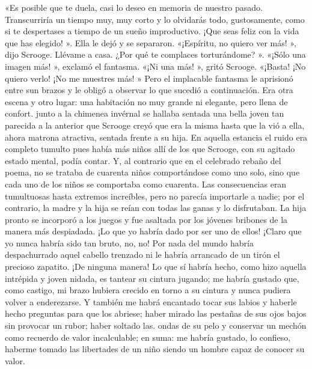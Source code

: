 \documentclass{novela}
\begin{document}
 «Es posible que te duela, casi lo deseo en memoria de nuestro pasado. Transcurriría un tiempo muy, muy corto y lo olvidarás todo, gustosamente, como si te despertases a tiempo de un sueño improductivo. ¡Que seas feliz con la vida que has elegido! ».
 Ella le dejó y se separaron.
 «¡Espíritu, no quiero ver más! », dijo Scrooge. Llévame a casa. ¿Por qué te complaces torturándome? ».
 «¡Sólo una imagen más! », exclamó el fantasma.
 «¡Ni una más! », gritó Scrooge. «¡Basta! ¡No quiero verlo! ¡No me muestres más! »
 Pero el implacable fantasma le aprisionó entre sun brazos y le obligó a observar lo que sucedió a continuación.
 Era otra escena y otro lugar: una habitación no muy grande ni elegante, pero llena de confort. junto a la chimenea invérnal se hallaba sentada una bella joven tan parecida a la anterior que Scrooge creyó que era la misma hasta que la vió a ella, ahora matrona atractiva, sentada frente a su hija. En aquella estancia el ruido era completo tumulto pues había más niños allí de los que Scrooge, con su agitado estado mental, podía contar. Y, al contrario que en el celebrado rebaño del poema, no se trataba de cuarenta niños comportándose como uno solo, sino que cada uno de los niños se comportaba como cuarenta. Las consecuencias eran tumultuosas hasta extremos increíbles, pero no parecía importarle a nadie; por el contrario, la madre y la hija se reían con todas las ganas y lo disfrutaban. La hija pronto se incorporó a los juegos y fue asaltada por los jóvenes bribones de la manera más despiadada. ¡Lo que yo habría dado por ser uno de ellos! ¡Claro que yo nunca habría sido tan bruto, no, no! Por nada del mundo habría despachurrado aquel cabello trenzado ni le habría arrancado de un tirón el precioso zapatito. ¡De ninguna manera! Lo que sí habría hecho, como hizo aquella intrépida y joven nidada, es tantear su cintura jugando; me habría gustado que, como castigo, mi brazo hubiera crecido en torno a su cintura y nunca pudiera volver a enderezarse. Y también me habrá encantado tocar sus labios y haberle hecho preguntas para que los abriese; haber mirado las pestañas de sus ojos bajos sin provocar un rubor; haber soltado las. ondas de su pelo y conservar un mechón como recuerdo de valor incalculable; en suma: me habría gustado, lo confieso, haberme tomado las libertades de un niño siendo un hombre capaz de conocer su valor.
\end{document}
